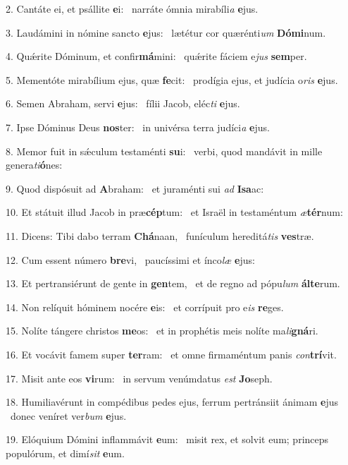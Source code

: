 2. Cantáte ei, et psállite \textbf{e}i: \ast\  narráte ómnia mirabíli\textit{a} \textbf{e}jus.\

3. Laudámini in nómine sancto \textbf{e}jus: \ast\  lætétur cor quærénti\textit{um} \textbf{Dó}\textbf{mi}num.\

4. Quǽrite Dóminum, et confir\textbf{má}mini: \ast\  quǽrite fáciem e\textit{jus} \textbf{sem}per.\

5. Mementóte mirabílium ejus, quæ \textbf{fe}cit: \ast\  prodígia ejus, et judícia o\textit{ris} \textbf{e}jus.\

6. Semen Abraham, servi \textbf{e}jus: \ast\  fílii Jacob, eléc\textit{ti} \textbf{e}jus.\

7. Ipse Dóminus Deus \textbf{nos}ter: \ast\  in univérsa terra judíci\textit{a} \textbf{e}jus.\

8. Memor fuit in sǽculum testaménti \textbf{su}i: \ast\  verbi, quod mandávit in mille genera\textit{ti}\textbf{ó}nes:\

9. Quod dispósuit ad \textbf{A}braham: \ast\  et juraménti sui \textit{ad} \textbf{I}\textbf{sa}ac:\

10. Et státuit illud Jacob in præ\textbf{cép}tum: \ast\  et Israël in testaméntum \textit{æ}\textbf{tér}num:\

11. Dicens: Tibi dabo terram \textbf{Chá}naan, \ast\  funículum hereditá\textit{tis} \textbf{ves}træ.\

12. Cum essent número \textbf{bre}vi, \ast\  paucíssimi et ínco\textit{læ} \textbf{e}jus:\

13. Et pertransiérunt de gente in \textbf{gen}tem, \ast\  et de regno ad pópu\textit{lum} \textbf{ál}\textbf{te}rum.\

14. Non relíquit hóminem nocére \textbf{e}is: \ast\  et corrípuit pro e\textit{is} \textbf{re}ges.\

15. Nolíte tángere christos \textbf{me}os: \ast\  et in prophétis meis nolíte ma\textit{li}\textbf{gná}ri.\

16. Et vocávit famem super \textbf{ter}ram: \ast\  et omne firmaméntum panis \textit{con}\textbf{trí}vit.\

17. Misit ante eos \textbf{vi}rum: \ast\  in servum venúmdatus \textit{est} \textbf{Jo}seph.\

18. Humiliavérunt in compédibus pedes ejus, ferrum pertránsiit ánimam \textbf{e}jus \ast\  donec veníret ver\textit{bum} \textbf{e}jus.\

19. Elóquium Dómini inflammávit \textbf{e}um: \ast\  misit rex, et solvit eum; princeps populórum, et dimí\textit{sit} \textbf{e}um.\

